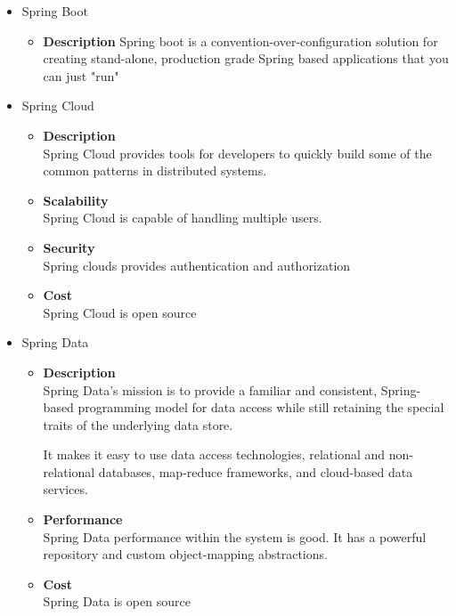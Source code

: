 \documentclass[a4paper,10pt]{article}
\begin{document}
\begin{itemize}
		\item Spring Boot
			\begin{itemize}
				\item \textbf{Description}
				Spring boot is a convention-over-configuration solution for creating stand-alone, production grade Spring based applications that you can just "run"
			\end{itemize}
			
		\item Spring Cloud
			\begin{itemize}
				\item \textbf{Description}\\
					Spring Cloud provides tools for developers to quickly build some of the common patterns in distributed systems.			
				\item \textbf{Scalability}\\
					Spring Cloud is capable of handling multiple users.
				\item \textbf{Security}\\
					Spring clouds provides authentication and authorization
				\item \textbf{Cost}\\
					Spring Cloud is open source
			\end{itemize}
			
		\item Spring Data
			\begin{itemize}
				\item \textbf{Description}\\
					Spring Data's mission is to provide a familiar and consistent, Spring-based programming model for data access while still retaining the special traits of the underlying data store.

					It makes it easy to use data access technologies, relational and non-relational databases, map-reduce frameworks, and cloud-based data services.
				\item \textbf{Performance}\\
					Spring Data performance within the system is good. It has a powerful repository and custom object-mapping abstractions.		
				
				\item \textbf{Cost}\\
					Spring Data is open source
			\end{itemize}
			

\end{itemize}
\end{document}
